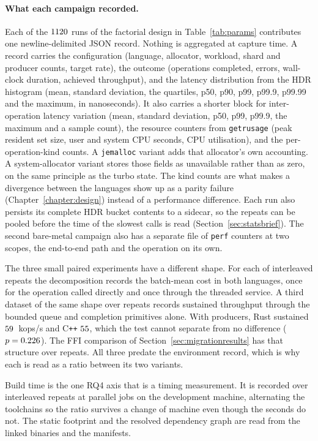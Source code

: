 \documentclass[english,oneside,a4paper,censored,csm,software-track-2020]{HYthesisML}
\begin{document}
\begin{appendices}
\paragraph{What each campaign recorded.}
Each of the $1120$ runs of the factorial design in Table~\ref{tab:params} contributes one
newline-delimited JSON record. Nothing is aggregated at capture time. A record carries the
configuration (language, allocator, workload, shard and producer counts, target rate), the
outcome (operations completed, errors, wall-clock duration, achieved throughput), and the
latency distribution from the HDR histogram (mean, standard deviation, the quartiles, p50, p90,
p99, p99.9, p99.99 and the maximum, in nanoseconds). It also carries a shorter block for
inter-operation latency variation (mean, standard deviation, p50, p99, p99.9, the maximum and a
sample count), the resource counters from \texttt{getrusage} (peak resident set size, user and
system CPU seconds, CPU utilisation), and the per-operation-kind counts. A \texttt{jemalloc}
variant adds that allocator's own accounting. A system-allocator variant stores those fields as
unavailable rather than as zero, on the same principle as the turbo state.
The kind counts are what makes a divergence between the languages show up as a parity failure
(Chapter~\ref{chapter:design}) instead of a performance difference. Each run also persists its
complete HDR bucket contents to a sidecar, so the repeats can be pooled before the
time of the slowest calls is read (Section~\ref{sec:statsbrief}). The second bare-metal campaign also has a
separate file of \texttt{perf} counters at two scopes, the end-to-end path and the operation on
its own.

The three small paired experiments have a different shape. For each of \BudgetRepeats{}
interleaved repeats the decomposition records the batch-mean cost in both languages, once for
the operation called directly and once through the threaded service. A third dataset of the same
shape over \ContentionRepeats{} repeats records sustained throughput through the bounded queue and
completion primitives alone. With \ContentionProducers{} producers, Rust sustained
$59$~kops/s and C\texttt{++} $55$, which the test cannot separate
from no difference ($p = 0.226$). The FFI comparison of
Section~\ref{sec:migrationresults} has that structure over \FfiOpRepeats{} repeats. All three
predate the environment record, which is why each is read as a ratio between its two variants.

Build time is the one RQ4 axis that is a timing measurement. It is recorded over
\AdoptRepeats{} interleaved repeats at \AdoptJobs{} parallel jobs on the development machine,
alternating the toolchains so the ratio survives a change of machine even though the seconds do
not. The static footprint and the resolved dependency graph are read from the linked binaries
and the manifests.


\end{appendices}
\end{document}
